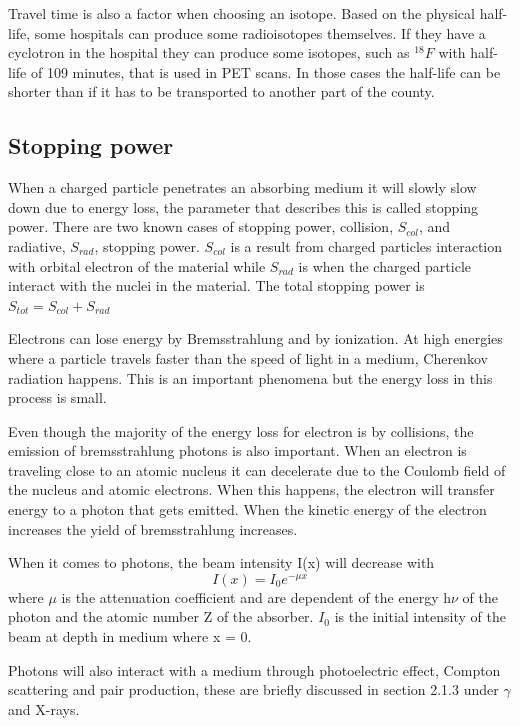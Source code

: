 \documentclass[twoside,english]{uiofysmaster/uiofysmaster}
\begin{document}
Travel time is also a factor when choosing an isotope. Based on the physical half-life, some hospitals can produce some radioisotopes themselves. If they have a cyclotron in the hospital they can produce some isotopes, such as $^{18}F$ with half-life of 109 minutes, that is used in PET scans. In those cases the half-life can be shorter than if it has to be transported to another part of the county. 


\subsection{Stopping power}
When a charged particle penetrates an absorbing medium it will slowly slow down due to energy loss, the parameter that describes this is called stopping power. There are two known cases of stopping power\cite{Nuclear_medicine}, collision, $S_{col}$, and radiative, $S_{rad}$, stopping power. $S_{col}$ is a result from charged particles interaction with orbital electron of the material while $S_{rad}$ is when the charged particle interact with the nuclei in the material. The total stopping power is $S_{tot} = S_{col} + S_{rad}$ 

Electrons can lose energy by Bremsstrahlung and by ionization. At high energies where a particle travels faster than the speed of light in a medium, Cherenkov radiation happens. This is an important phenomena but the energy loss in this process is small\cite{nuclearchem}.

Even though the majority of the energy loss for electron is by collisions, the emission of bremsstrahlung photons is also important. When an electron is traveling close to an atomic nucleus it can decelerate due to the Coulomb field of the nucleus and atomic electrons. When this happens, the electron will transfer energy to a photon that gets emitted. When the kinetic energy of the electron increases the yield of bremsstrahlung increases.


When it comes to photons, the beam intensity I(x) will decrease with \begin{equation}
    I(x) = I_0e^{-\mu x}
\end{equation}
\noindent
where $\mu$ is the attenuation coefficient and are dependent of the energy h$\nu$ of the photon and the atomic number Z of the absorber\cite{Nuclear_medicine}. $I_0$ is the initial intensity of the beam at depth in medium where x = 0.

Photons will also interact with a medium through photoelectric effect, Compton scattering and pair production, these are briefly discussed in section 2.1.3 under $\gamma$ and X-rays.
\end{document}
